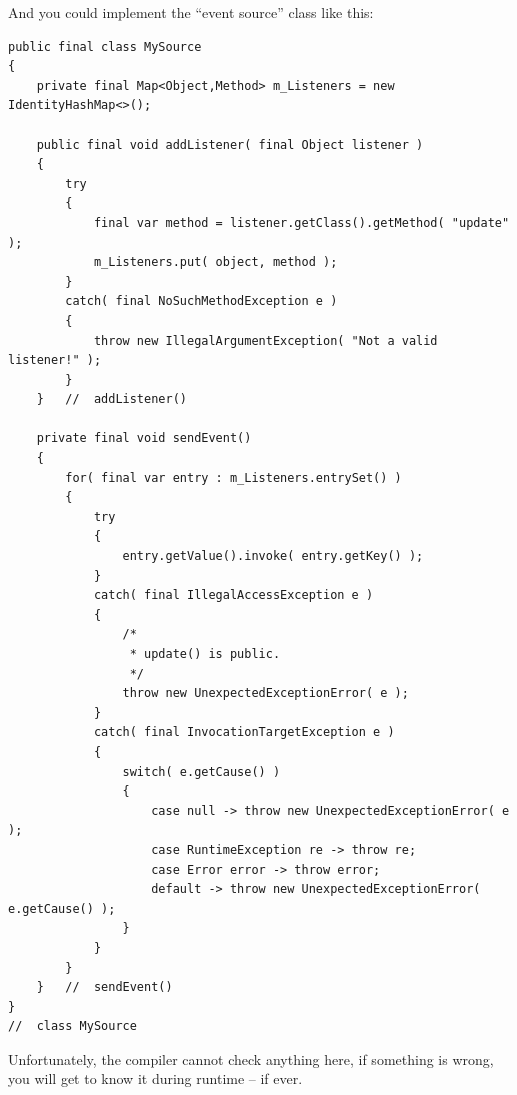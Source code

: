 And you could implement the “event source” class like this:
\begin{lstlisting}
public final class MySource
{
    private final Map<Object,Method> m_Listeners = new IdentityHashMap<>();
    
    public final void addListener( final Object listener )
    {
        try
        {
            final var method = listener.getClass().getMethod( "update" );
            m_Listeners.put( object, method );
        }
        catch( final NoSuchMethodException e )
        {
            throw new IllegalArgumentException( "Not a valid listener!" );
        }
    }   //  addListener()
    
    private final void sendEvent()
    {
        for( final var entry : m_Listeners.entrySet() )
        {
            try
            {
                entry.getValue().invoke( entry.getKey() );
            }
            catch( final IllegalAccessException e )
            {
                /*
                 * update() is public.
                 */
                throw new UnexpectedExceptionError( e );
            }
            catch( final InvocationTargetException e )
            {
                switch( e.getCause() )
                {
                    case null -> throw new UnexpectedExceptionError( e );
                    case RuntimeException re -> throw re;
                    case Error error -> throw error;
                    default -> throw new UnexpectedExceptionError( e.getCause() );
                }
            }
        }
    }   //  sendEvent()
}
//  class MySource
\end{lstlisting}

Unfortunately, the compiler cannot check anything here, if something is wrong, you will get to know it during runtime – if ever.

